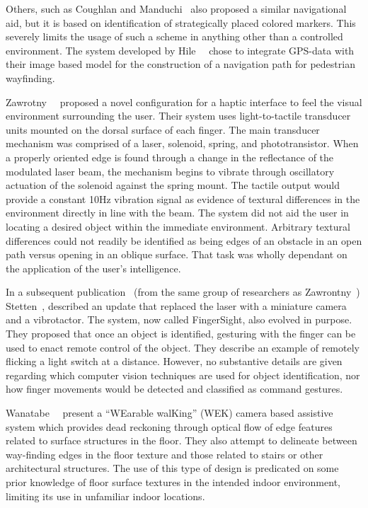 Others, such as Coughlan and Manduchi~\cite{COUGHLAN09} also proposed a similar navigational aid, but it is based on identification of strategically placed colored markers.  This severely limits the usage of such a scheme in anything other than a controlled environment.  The system developed by Hile~\etal~\cite{HILE09} chose to integrate GPS-data with their image based model for the construction of a navigation path for pedestrian wayfinding.

Zawrotny~\etal~\cite{ZAWROTNY06} proposed a novel configuration for a haptic interface to feel the visual environment surrounding the user.  Their system uses light-to-tactile transducer units mounted on the dorsal surface of each finger.  The main transducer mechanism was comprised of a laser, solenoid, spring, and phototransistor.  When a properly oriented edge is found through a change in the reflectance of the modulated laser beam, the mechanism begins to vibrate through oscillatory actuation of the solenoid against the spring mount.  The tactile output would provide a constant 10Hz vibration signal as evidence of textural differences in the environment directly in line with the beam.  The system did not aid the user in locating a desired object within the immediate environment.  Arbitrary textural differences could not readily be identified as being edges of an obstacle in an open path versus opening in an oblique surface.  That task was wholly dependant on the application of the user's intelligence.

In a subsequent publication~\cite{STETTEN07} (from the same group of researchers as Zawrontny~\etal) Stetten~\etal, described an update that replaced the laser with a miniature camera and a vibrotactor.  The system, now called FingerSight\textsuperscript{\texttrademark}, also evolved in purpose.  They proposed that once an object is identified, gesturing with the finger can be used to enact remote control of the object.  They describe an example of remotely flicking a light switch at a distance.  However, no substantive details are given regarding which computer vision techniques are used for object identification, nor how finger movements would be detected and classified as command gestures.

Wanatabe~\etal~\cite{WANATABE07} present a ``WEarable walKing'' (WEK) camera based assistive system which provides dead reckoning through optical flow of edge features related to surface structures in the floor.  They also attempt to delineate between way-finding edges in the floor texture and those related to stairs or other architectural structures.  The use of this type of design is predicated on some prior knowledge of floor surface textures in the intended indoor environment, limiting its use in unfamiliar indoor locations.

